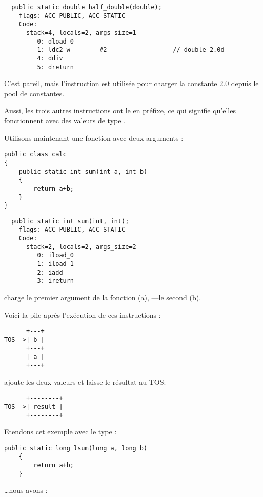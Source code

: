 \begin{lstlisting}
  public static double half_double(double);
    flags: ACC_PUBLIC, ACC_STATIC
    Code:
      stack=4, locals=2, args_size=1
         0: dload_0       
         1: ldc2_w        #2                  // double 2.0d
         4: ddiv          
         5: dreturn       
\end{lstlisting}

C'est pareil, mais l'instruction  est utilisée pour charger la constante
2.0 depuis le pool de constantes.

Aussi, les trois autres instructions ont le  en préfixe,
ce qui signifie qu'elles fonctionnent avec des valeurs de type .


Utilisons maintenant une fonction avec deux arguments :

\begin{lstlisting}[style=customjava]
public class calc
{
	public static int sum(int a, int b)
	{
		return a+b;
	}
}
\end{lstlisting}

\begin{lstlisting}
  public static int sum(int, int);
    flags: ACC_PUBLIC, ACC_STATIC
    Code:
      stack=2, locals=2, args_size=2
         0: iload_0       
         1: iload_1       
         2: iadd          
         3: ireturn       
\end{lstlisting}

 charge le premier argument de la fonction (a), ---le second (b).

Voici la pile après l'exécution de ces instructions :

\begin{lstlisting}
      +---+
TOS ->| b |
      +---+
      | a |
      +---+
\end{lstlisting}

 ajoute les deux valeurs et laisse le résultat au \ac{TOS}:


\begin{lstlisting}
      +--------+
TOS ->| result |
      +--------+
\end{lstlisting}

Etendons cet exemple avec le type  :


\begin{lstlisting}[style=customjava]
	public static long lsum(long a, long b)
	{
		return a+b;
	}
\end{lstlisting}

\dots nous avons :

